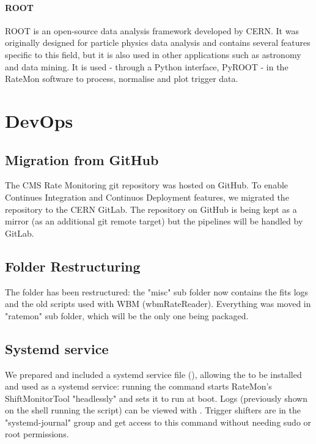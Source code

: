 \paragraph{ROOT} ROOT \cite{Brun:1997pa} is an open-source data analysis framework developed by CERN. It was originally designed for particle physics data analysis and contains several features specific to this field, but it is also used in other applications such as astronomy and data mining. It is used - through a Python interface, PyROOT \cite{PythoninterfacePyROOTROOT-2020-10-02} - in the RateMon software to process, normalise and plot trigger data.


\section{DevOps}

\subsection{Migration from GitHub}

The CMS Rate Monitoring git repository was hosted on GitHub. To enable Continues Integration and Continuos Deployment features, we migrated the repository to the CERN GitLab. The repository on GitHub is being kept as a mirror (as an additional git remote target) but the pipelines will be handled by GitLab.

\subsection{Folder Restructuring}

The folder has been restructured: the "misc" sub folder now contains the fits logs and the old scripts used with WBM (wbmRateReader). Everything was moved in "ratemon" sub folder, which will be the only one being packaged.

\subsection{Systemd service}

We prepared and included a systemd service file (), allowing the  to be installed and used as a systemd service: running the  command starts RateMon's ShiftMonitorTool "headlessly" and sets it to run at boot. Logs (previously shown on the shell running the script) can be viewed with . Trigger shifters are in the "systemd-journal" group and get access to this command without needing sudo or root permissions.


